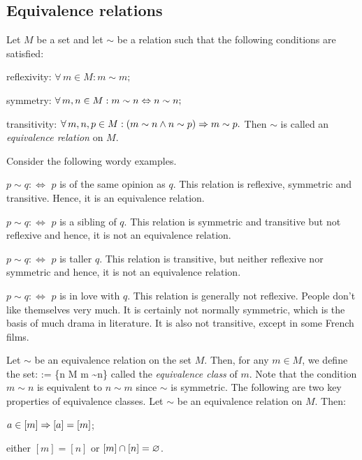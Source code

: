 \subsection{Equivalence relations}

\bd
Let $M$ be a set and let $\sim$ be a relation such that the following conditions are satisfied:
\ben
\item[i)] reflexivity: $\forall \, m \in M: m \sim m;$
\item[ii)] symmetry: $\forall \, m,n \in M: m \sim n \Leftrightarrow n \sim n;$
\item[iii)] transitivity: $\forall \, m,n,p \in M: (m \sim n \land n \sim p) \Rightarrow m \sim p.$
\een
Then $\sim$ is called an \emph{equivalence relation} on $M$.
\ed

\be
Consider the following wordy examples.
\ben[label=\alph*)]
\item $p\sim q :\Leftrightarrow $ $p$ is of the same opinion as $q$. This relation is reflexive, symmetric and transitive. Hence, it is an equivalence relation.
\item $p\sim q :\Leftrightarrow $ $p$ is a sibling of $q$. This relation is symmetric and transitive but not reflexive and hence, it is not an equivalence relation.
\item $p\sim q :\Leftrightarrow $ $p$ is taller $q$. This relation is transitive, but neither reflexive nor symmetric and hence, it is not an equivalence relation.
\item $p\sim q :\Leftrightarrow $ $p$ is in love with $q$. This relation is generally not reflexive. People don't like themselves very much. It is certainly not normally symmetric, which is the basis of much drama in literature. It is also not transitive, except in some French films.
\een
\ee

\bd
Let $\sim$ be an equivalence relation on the set $M$. Then, for any $m \in M$, we define the set:
\bse
[m] := \{n \in M \mid m \sim n\}
\ese
called the \emph{equivalence class} of $m$. Note that the condition $m \sim n$ is equivalent to $n \sim m$ since $\sim$ is symmetric.
\ed
The following are two key properties of equivalence classes.
\bp
Let $\sim$ be an equivalence relation on $M$. Then:
\ben
\item[i)] $a \in [m] \Rightarrow [a]=[m]$;
\item[ii)] either $[m]=[n]$ or $[m] \cap [n] = \varnothing$.
\een
\ep

